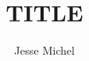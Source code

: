 \documentclass[sigconf, review, anonymous]{acmart}
\theoremstyle{definition}
\begin{document}
\title{TITLE}

\author{Jesse Michel}
\maketitle


% 
% 
% 
% 
% 
% 
% 


\end{document}
